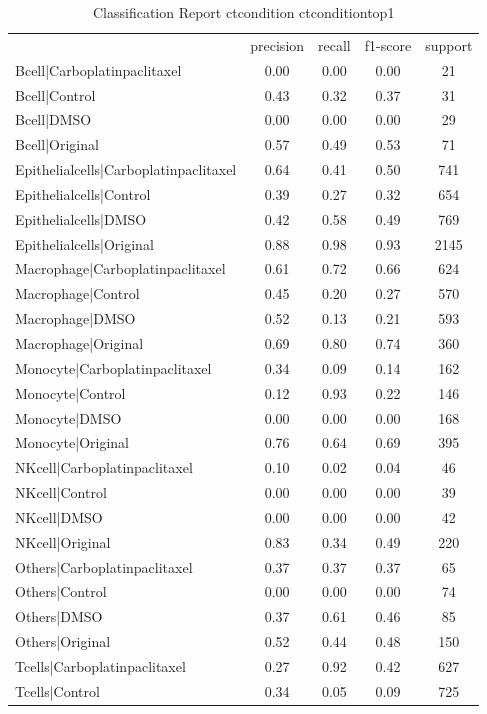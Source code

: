 \begin{table}[htbp]
\centering
\caption{Classification Report ctcondition ctconditiontop1}
\label{tab:classificationreport.ctcondition.ctconditiontop1}
\begin{tabular}{lcccc}
 & precision & recall & f1-score & support \\
Bcell|Carboplatinpaclitaxel & 0.00 & 0.00 & 0.00 & 21 \\
Bcell|Control & 0.43 & 0.32 & 0.37 & 31 \\
Bcell|DMSO & 0.00 & 0.00 & 0.00 & 29 \\
Bcell|Original & 0.57 & 0.49 & 0.53 & 71 \\
Epithelialcells|Carboplatinpaclitaxel & 0.64 & 0.41 & 0.50 & 741 \\
Epithelialcells|Control & 0.39 & 0.27 & 0.32 & 654 \\
Epithelialcells|DMSO & 0.42 & 0.58 & 0.49 & 769 \\
Epithelialcells|Original & 0.88 & 0.98 & 0.93 & 2145 \\
Macrophage|Carboplatinpaclitaxel & 0.61 & 0.72 & 0.66 & 624 \\
Macrophage|Control & 0.45 & 0.20 & 0.27 & 570 \\
Macrophage|DMSO & 0.52 & 0.13 & 0.21 & 593 \\
Macrophage|Original & 0.69 & 0.80 & 0.74 & 360 \\
Monocyte|Carboplatinpaclitaxel & 0.34 & 0.09 & 0.14 & 162 \\
Monocyte|Control & 0.12 & 0.93 & 0.22 & 146 \\
Monocyte|DMSO & 0.00 & 0.00 & 0.00 & 168 \\
Monocyte|Original & 0.76 & 0.64 & 0.69 & 395 \\
NKcell|Carboplatinpaclitaxel & 0.10 & 0.02 & 0.04 & 46 \\
NKcell|Control & 0.00 & 0.00 & 0.00 & 39 \\
NKcell|DMSO & 0.00 & 0.00 & 0.00 & 42 \\
NKcell|Original & 0.83 & 0.34 & 0.49 & 220 \\
Others|Carboplatinpaclitaxel & 0.37 & 0.37 & 0.37 & 65 \\
Others|Control & 0.00 & 0.00 & 0.00 & 74 \\
Others|DMSO & 0.37 & 0.61 & 0.46 & 85 \\
Others|Original & 0.52 & 0.44 & 0.48 & 150 \\
Tcells|Carboplatinpaclitaxel & 0.27 & 0.92 & 0.42 & 627 \\
Tcells|Control & 0.34 & 0.05 & 0.09 & 725 \\

\end{tabular}
\end{table}
